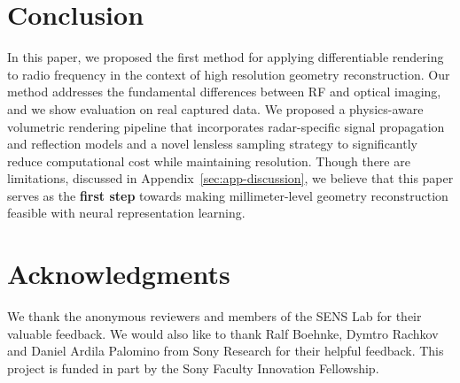 \section{Conclusion}
\vspace{-1em}
\label{sec:conc-lim}
In this paper, we proposed the first method for applying differentiable rendering to radio frequency in the context of high resolution geometry reconstruction.
Our method addresses the fundamental differences between RF and optical imaging, and we show evaluation on real captured data.
We proposed a physics-aware volumetric rendering pipeline that incorporates radar-specific signal propagation and reflection models and a novel lensless sampling strategy to significantly reduce computational cost while maintaining resolution. Though there are limitations, discussed in Appendix~\ref{sec:app-discussion}, we believe that this paper serves as the \textbf{first step} towards making millimeter-level geometry reconstruction feasible with neural representation learning.

\section*{Acknowledgments}
\vspace{-1em}
We thank the anonymous reviewers and members of the SENS Lab for their valuable feedback. We would also like to thank Ralf Boehnke, Dymtro Rachkov and Daniel Ardila Palomino from Sony Research for their helpful feedback. This project is funded in part by the Sony Faculty Innovation Fellowship.